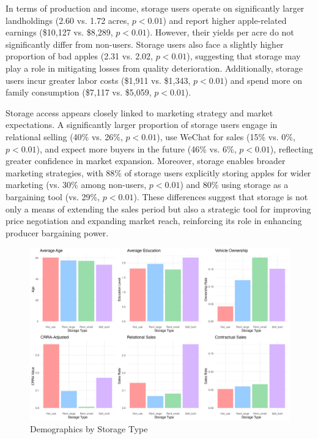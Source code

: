 In terms of production and income, storage users operate on significantly larger landholdings (2.60 vs. 1.72 acres, $p < 0.01$) and report higher apple-related earnings (\$10,127 vs. \$8,289, $p < 0.01$). However, their yields per acre do not significantly differ from non-users. Storage users also face a slightly higher proportion of bad apples (2.31 vs. 2.02, $p < 0.01$), suggesting that storage may play a role in mitigating losses from quality deterioration. Additionally, storage users incur greater labor costs (\$1,911 vs. \$1,343, $p < 0.01$) and spend more on family consumption (\$7,117 vs. \$5,059, $p < 0.01$).  

Storage access appears closely linked to marketing strategy and market expectations. A significantly larger proportion of storage users engage in relational selling (40\% vs. 26\%, $p < 0.01$), use WeChat for sales (15\% vs. 0\%, $p < 0.01$), and expect more buyers in the future (46\% vs. 6\%, $p < 0.01$), reflecting greater confidence in market expansion. Moreover, storage enables broader marketing strategies, with 88\% of storage users explicitly storing apples for wider marketing (vs. 30\% among non-users, $p < 0.01$) and 80\% using storage as a bargaining tool (vs. 29\%, $p < 0.01$). These differences suggest that storage is not only a means of extending the sales period but also a strategic tool for improving price negotiation and expanding market reach, reinforcing its role in enhancing producer bargaining power.  

\begin{figure}[htp]
\centering
\includegraphics[width=1\textwidth]{figures/combined_storage_metrics.png}
\caption{Demographics by Storage Type}
\label{Figure: Demographics by Storage Type}
\end{figure}

